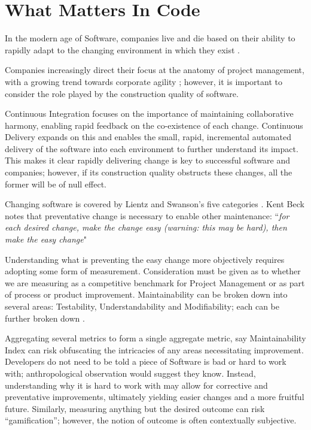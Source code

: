 \section{What Matters In Code}

In the modern age of Software, companies live and die based on their ability to rapidly adapt to the changing environment in which they exist \parencite[Chapter~1]{kersten_2018}.

Companies increasingly direct their focus at the anatomy of project management, with a growing trend towards corporate agility \parencite{stateOfAgile_2019}; however, it is important to consider the role played by the construction quality of software.

Continuous Integration \parencite{duvall2007continuous} focuses on the importance of maintaining collaborative harmony, enabling rapid feedback on the co-existence of each change. Continuous Delivery \parencite{humble_farley_2010} expands on this and enables the small, rapid, incremental automated delivery of the software into each environment to further understand its impact. This makes it clear rapidly delivering change is key to successful software and companies; however, if its construction quality obstructs these changes, all the former will be of null effect.

Changing software is covered by Lientz and Swanson's five categories \parencite*{lientz1980software}. Kent Beck notes that preventative change is necessary to enable other maintenance: ``\textit{for each desired change, make the change easy (warning: this may be hard), then make the easy change}" \parencite{beck_2012_easychange}

Understanding what is preventing the easy change more objectively requires adopting some form of measurement. Consideration must be given as to whether we are measuring as a competitive benchmark for Project Management or as part of process or product improvement. Maintainability can be broken down into several areas: Testability, Understandability and Modifiability; each can be further broken down \parencite{Boehm:1976:QES:800253.807736}.

Aggregating several metrics to form a single aggregate metric, say Maintainability Index \parencite{bray1997c4} can risk obfuscating the intricacies of any areas necessitating improvement. Developers do not need to be told a piece of Software is bad or hard to work with; anthropological observation would suggest they know. Instead, understanding why it is hard to work with may allow for corrective and preventative improvements, ultimately yielding easier changes and a more fruitful future. Similarly, measuring anything but the desired outcome can risk ``gamification''; however, the notion of outcome is often contextually subjective. 

